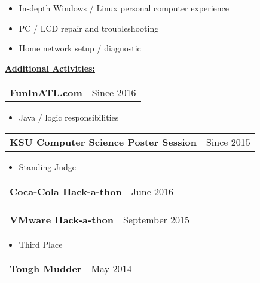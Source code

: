 \documentclass{book}
\newenvironment{myitemize}
{ \begin{itemize}
	\setlength{\itemsep}{0pt}
	\setlength{\parskip}{0pt}
	\setlength{\parsep}{0pt}     }
{ \end{itemize}                  }
\begin{document}
\begin{myitemize}
	
	\item In-depth Windows / Linux personal computer experience
	\item PC / LCD repair and troubleshooting
	\item Home network setup / diagnostic

\end{myitemize}

\underline{\Large {\bfseries Additional Activities:}}

\enspace

\begin{tabular}{L{4.75in}R{1.75in}}

	{\large {\bfseries FunInATL.com}} & Since 2016 \\

\end{tabular}

	\vspace{-\topsep}
	\begin{myitemize}

		\item Java / logic responsibilities

	\end{myitemize} 

\begin{tabular}{L{4.75in}R{1.75in}}

	{\large {\bfseries KSU Computer Science Poster Session}} & Since 2015 \\

\end{tabular}

	\vspace{-\topsep}
	\begin{myitemize}

		\item Standing Judge

	\end{myitemize} 

\begin{tabular}{L{4.75in}R{1.75in}}

	{\large {\bfseries Coca-Cola Hack-a-thon}} & June 2016 \\

\end{tabular}

\begin{tabular}{L{4.75in}R{1.75in}}

	{\large {\bfseries VMware Hack-a-thon}} & September 2015 \\

\end{tabular}

	\vspace{-\topsep}
	\begin{myitemize}
		\item Third Place 
	\end{myitemize} 


\begin{tabular}{L{4.75in}R{1.75in}}
	
	{\large {\bfseries Tough Mudder}} & May 2014 \\

\end{tabular}
\end{document}
